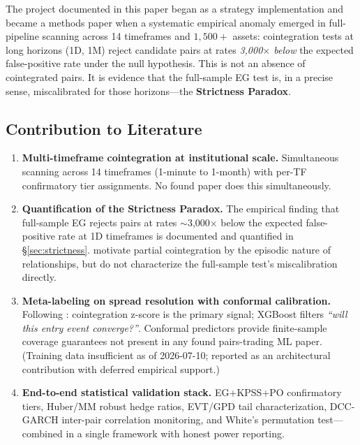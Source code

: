 \documentclass[12pt,a4paper]{article}
\begin{document}
The project documented in this paper began as a strategy implementation and became
a methods paper when a systematic empirical anomaly emerged in full-pipeline
scanning across 14 timeframes and $1{,}500+$ assets: cointegration tests at long
horizons (1D, 1M) reject candidate pairs at rates \emph{3,000$\times$ below} the
expected false-positive rate under the null hypothesis. This is not an absence of
cointegrated pairs. It is evidence that the full-sample EG test is, in a precise
sense, miscalibrated for those horizons---the \textbf{Strictness Paradox}.

\subsection{Contribution to Literature}

\begin{enumerate}
  \item \textbf{Multi-timeframe cointegration at institutional scale.} Simultaneous
    scanning across 14 timeframes (1-minute to 1-month) with per-TF confirmatory
    tier assignments. No found paper does this simultaneously.

  \item \textbf{Quantification of the Strictness Paradox.} The empirical finding
    that full-sample EG rejects pairs at rates $\sim$3,000$\times$ below the
    expected false-positive rate at 1D timeframes is documented and quantified in
    \S\ref{sec:strictness}. \citet{clegg_krauss2018} motivate partial cointegration
    by the episodic nature of relationships, but do not characterize the full-sample
    test's miscalibration directly.

  \item \textbf{Meta-labeling on spread resolution with conformal calibration.}
    Following \citet{lopezdeprado2018}: cointegration z-score is the primary signal;
    XGBoost filters \emph{``will this entry event converge?''}. Conformal predictors
    provide finite-sample coverage guarantees not present in any found pairs-trading
    ML paper. (Training data insufficient as of 2026-07-10; reported as an
    architectural contribution with deferred empirical support.)

  \item \textbf{End-to-end statistical validation stack.} EG+KPSS+PO confirmatory
    tiers, Huber/MM robust hedge ratios, EVT/GPD tail characterization, DCC-GARCH
    inter-pair correlation monitoring, and White's permutation test---combined in a
    single framework with honest power reporting.
\end{enumerate}
\end{document}
